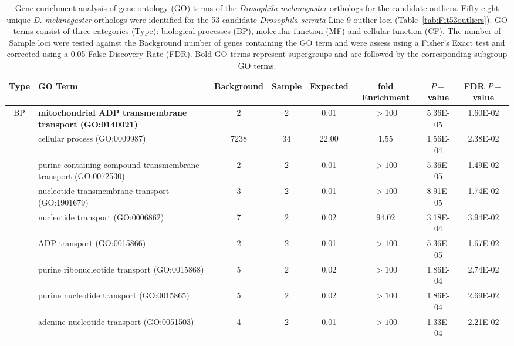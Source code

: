 \newpage
\FloatBarrier
\begin{table}[!b]
\renewcommand{\arraystretch}{1.2}
\begin{center}
\small
\caption[Gene enrichment analysis of gene ontology (GO) terms of the \textit{Drosophila melanogaster} orthologs for the candidate outliers.]{Gene enrichment analysis of gene ontology (GO) terms of the \textit{Drosophila melanogaster} orthologs for the candidate outliers. Fifty-eight unique \textit{D. melanogaster} orthologs were identified for the 53 candidate \textit{Drosophila serrata} Line 9 outlier loci (Table~\ref{tab:Fit53outliers}). GO terms consist of three categories (Type): biological processes (BP), molecular function (MF) and cellular function (CF). The number of Sample loci were tested against the Background number of genes containing the GO term and were assess using a Fisher’s Exact test and corrected using a 0.05 False Discovery Rate (FDR). Bold GO terms represent supergroups and are followed by the corresponding subgroup GO terms.}
\label{tab:DNAsuppGOterms}
\tiny
\begin{tabular}{clS[table-format=4.0]S[table-format=2.0]S[table-format=2.2]ccc}
\toprule
\textbf{Type} &\textbf{GO Term} &\textbf{Background} &\textbf{Sample} &\textbf{Expected} &\textbf{fold Enrichment} &\textbf{$P-$value} &\textbf{FDR $P-$value}\\
\midrule
BP & \textbf{mitochondrial ADP transmembrane transport (GO:0140021)} & 2 & 2 & 0.01 & $> 100$ & 5.36E-05 & 1.60E-02 \\
 & cellular process (GO:0009987) & 7238 & 34 & 22.00 & $1.55$ & 1.56E-04 & 2.38E-02 \\
 & purine-containing compound transmembrane transport (GO:0072530) & 2 & 2 & 0.01 & $> 100$ & 5.36E-05 & 1.49E-02 \\
 & nucleotide transmembrane transport (GO:1901679) & 3 & 2 & 0.01 & $> 100$ & 8.91E-05 & 1.74E-02 \\
 & nucleotide transport (GO:0006862) & 7 & 2 & 0.02 & $94.02$ & 3.18E-04 & 3.94E-02 \\
 & ADP transport (GO:0015866) & 2 & 2 & 0.01 & $> 100$ & 5.36E-05 & 1.67E-02 \\
 & purine ribonucleotide transport (GO:0015868) & 5 & 2 & 0.02 & $> 100$ & 1.86E-04 & 2.74E-02 \\
 & purine nucleotide transport (GO:0015865) & 5 & 2 & 0.02 & $> 100$ & 1.86E-04 & 2.69E-02 \\
 & adenine nucleotide transport (GO:0051503) & 4 & 2 & 0.01 & $> 100$ & 1.33E-04 & 2.21E-02 \\[1.5ex]

\end{tabular}
\end{center}
\end{table}

